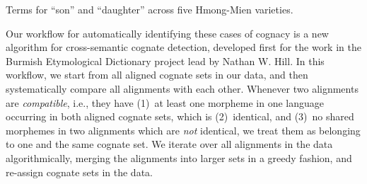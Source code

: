 \documentclass[xetex,svgnames]{scrartcl}
\begin{document}
\begin{table}[htb]
  \centering
  \caption{Terms for ``son'' and ``daughter'' across five Hmong-Mien varieties.}
  \label{tab:son}
\end{table}

Our workflow for automatically identifying these cases of cognacy is a new algorithm for
cross-semantic cognate detection, developed first for the work in the Burmish Etymological
Dictionary project lead by Nathan W. Hill. In this workflow, we start from all aligned cognate sets
in our data, and then systematically compare all alignments with each other. Whenever two
alignments are \emph{compatible}, i.e., they have (1)~at least one morpheme in one language
occurring in both aligned cognate sets, which is (2)~identical, and (3)~no shared morphemes in two
alignments which are \emph{not} identical, we treat them as belonging to one and the same cognate
set. We iterate over all alignments in the data algorithmically, merging the alignments into larger
sets in a greedy fashion, and re-assign cognate sets in the data. 
\end{document}
